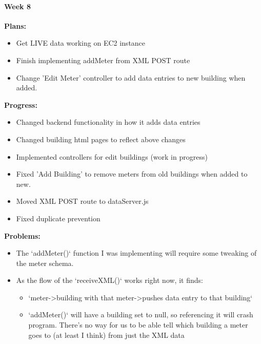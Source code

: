 \paragraph{Week 8}
\begin{adjustwidth}{2.5em}{0pt}
    \vspace{-0.5cm}\textbf{Plans:}
    \vspace{-0.5cm}
    \begin{itemize}
        \item Get LIVE data working on EC2 instance 
		\item Finish implementing addMeter from XML POST route 
		\item Change 'Edit Meter' controller to add data entries to new building when added. 
    \end{itemize} 
    \vspace{-0.3cm}\textbf{Progress:}
    \vspace{-0.5cm}
    \begin{itemize}
		\item Changed backend functionality in how it adds data entries
		\item Changed building html pages to reflect above changes
		\item Implemented controllers for edit buildings (work in progress) 
		\item Fixed 'Add Building' to remove meters from old buildings when added to new.
		\item Moved XML POST route to dataServer.js
		\item Fixed duplicate prevention 
    \end{itemize} 
    \vspace{-0.3cm}\textbf{Problems:}
    \vspace{-0.5cm}
	\begin{itemize}
    \item The `addMeter()` function I was implementing will require some tweaking of the meter schema.
	\item As the flow of the `receiveXML()` works right now, it finds: 
	\begin{itemize}
		\item `meter->building with that meter->pushes data entry to that building` 
		\item `addMeter()` will have a building set to null, so referencing it will crash program. There's no way for us to be able tell which building a meter goes to (at least I think) from just the XML data 
	\end{itemize}

\end{itemize}
\end{adjustwidth}
